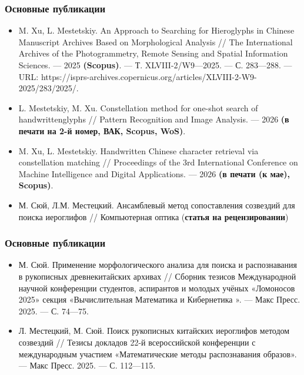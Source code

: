 \begin{frame} %
    \frametitle{Основные публикации}
    \begin{itemize}
        \item  M. Xu, L. Mestetskiy. An Approach to Searching for Hieroglyphs in Chinese Manuscript Archives Based on Morphological Analysis // The International Archives of the Photogrammetry, Remote Sensing and Spatial Information Sciences. — 2025 \textbf{(Scopus)}. — Т. XLVIII-2/W9—2025. — С. 283—288. — URL: https://isprs-archives.copernicus.org/articles/XLVIII-2-W9-2025/283/2025/.
        \item L. Mestetskiy, M. Xu. Constellation method for one-shot search of handwrittenglyphs // Pattern Recognition and Image Analysis. — 2026 \textbf{(в печати на 2-й номер, ВАК, Scopus, WoS)}.
        \item M. Xu, L. Mestetskiy. Handwritten Chinese character retrieval via constellation matching  // Proceedings of the 3rd International Conference on Machine Intelligence and Digital Applications. — 2026 \textbf{(в печати (к мае), Scopus)}.
        \item М. Сюй, Л.М. Местецкий. Ансамблевый метод сопоставления созвездий для поиска иероглифов // Компьютерная оптика (\textbf{статья на рецензировании})
    \end{itemize}
\end{frame}

\begin{frame} %
    \frametitle{Основные публикации}
    \begin{itemize}
        \item М. Сюй. Применение морфологического анализа для поиска и распознавания в рукописных древнекитайских архивах  // Сборник тезисов Международной научной конференции студентов, аспирантов и молодых учёных «Ломоносов 2025» секция «Вычислительная Математика и Кибернетика ». — Макс Пресс. 2025. — С. 74—75.
        \item Л. Местецкий, М. Сюй. Поиск рукописных китайских иероглифов методом созвездий // Тезисы докладов 22-й всероссийской конференции с международным участием «Математические методы распознавания образов». — Макс Пресс. 2025. — С. 112—115.
    \end{itemize}
\end{frame}

